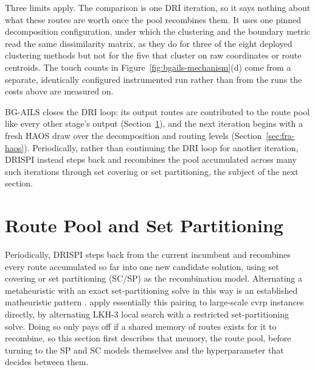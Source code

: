 Three limits apply. The comparison is one DRI iteration, so it says nothing about what these routes are worth once the pool recombines them. It uses one pinned decomposition configuration, under which the clustering and the boundary metric read the same dissimilarity matrix, as they do for three of the eight deployed clustering methods but not for the five that cluster on raw coordinates or route centroids. The touch counts in Figure~\ref{fig:bgails-mechanism}(d) come from a separate, identically configured instrumented run rather than from the runs the costs above are measured on.

BG-AILS closes the DRI loop: its output routes are contributed to the route pool like every other stage's output (Section~\ref{sec:fra-sp}), and the next iteration begins with a fresh HAOS draw over the decomposition and routing levels (Section~\ref{sec:fra-haos}). Periodically, rather than continuing the DRI loop for another iteration, DRISPI instead steps back and recombines the pool accumulated across many such iterations through set covering or set partitioning, the subject of the next section.

\section{Route Pool and Set Partitioning}\label{sec:fra-sp}


Periodically, DRISPI steps back from the current incumbent and recombines every route accumulated so far into one new candidate solution, using set covering or set partitioning (SC/SP) as the recombination model. Alternating a metaheuristic with an exact set-partitioning solve in this way is an established matheuristic pattern \citep{hybridizing_jourdan_2009}. \citet{cavaliereIntegratedLocalsearchSetpartitioning2022} apply essentially this pairing to large-scale \gls{cvrp} instances directly, by alternating LKH-3 local search with a restricted set-partitioning solve. Doing so only pays off if a shared memory of routes exists for it to recombine, so this section first describes that memory, the route pool, before turning to the SP and SC models themselves and the hyperparameter that decides between them.

